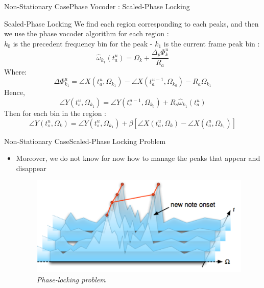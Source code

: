 \documentclass{bredelebeamer}
\begin{document}
\begin{frame}{Non-Stationary Case}{Phase Vocoder : Scaled-Phase Locking}
\begin{block}{ Scaled-Phase Locking}
We find each region corresponding to each peaks, and then we use the phase vocoder algorithm for each region :\\
$k_0$ is the precedent frequency bin for the peak - $k_1$ is the current frame peak bin :
\begin{equation}
\hat{\omega}_{k_1} (t_{a}^{u})= \Omega_{k} + \frac {\Delta_{p} \Phi_{k}^{u}} {R_{a}}
\end{equation}
\centering
Where:
\begin{equation}
\Delta\Phi_{k_1}^{u} = \angle X(t_{a}^{u}, \Omega_{k_1}) - \angle X(t_{a}^{u-1}, \Omega_{k_0}) - R_{a}\Omega_{k_1}
\end{equation}
\centering
Hence,
\begin{equation}
\angle Y(t_{s}^{u}, \Omega_{k_1}) = \angle Y(t_{s}^{u-1}, \Omega_{k_0}) + R_{s}\hat{\omega}_{k_1}(t_{a}^{u})
\end{equation}
\centering 
Then for each bin in the region :
\begin{equation}
\angle Y(t_{s}^{u}, \Omega_{k}) = \angle Y(t_{s}^{u}, \Omega_{k_1}) + \beta [ \angle X(t_{a}^{u}, \Omega_{k}) - \angle X(t_{a}^{u}, \Omega_{k_1}) ]
\end{equation}
\end{block}


\end{frame}
\begin{frame}{Non-Stationary Case}{Scaled-Phase Locking Problem}
\begin{itemize}
\item Moreover, we do not know for now how to manage the peaks that appear and disappear
\begin{figure}
      \includegraphics[scale=0.5]{phaselocking.png}
      \caption{\it Phase-locking problem}
\end{figure}
\end{itemize}

\end{frame}
\end{document}
